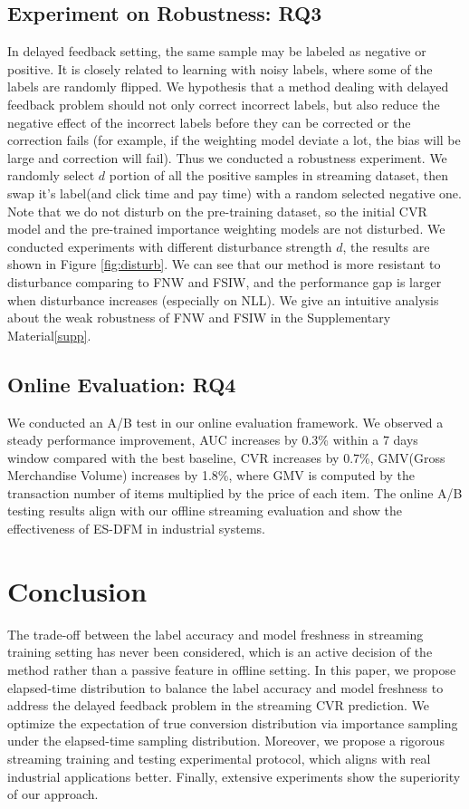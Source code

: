 \documentclass[letterpaper]{article} %
\newcommand{\mfigref}[1]{Figure \ref{#1}}
\begin{document}
\subsection{Experiment on Robustness: RQ3}

In delayed feedback setting, the same sample may be labeled as negative or positive. It is closely related to learning with noisy labels\cite{noisylabel}, where some of the labels are randomly flipped. We hypothesis that a method dealing with delayed feedback problem should not only correct incorrect labels, but also reduce the negative effect of the incorrect labels before they can be corrected or the correction fails (for example, if the weighting model deviate a lot, the bias will be large and correction will fail). Thus we conducted a robustness experiment. We randomly select $d$ portion of all the positive samples in streaming dataset, then swap it's label(and click time and pay time) with a random selected negative one. Note that we do not disturb on the pre-training dataset, so the initial CVR model and the pre-trained importance weighting models are not disturbed. We conducted experiments with different disturbance strength $d$, the results are shown in \mfigref{fig:disturb}. We can see that our method is more resistant to disturbance comparing to FNW and FSIW, and the performance gap is larger when disturbance increases (especially on NLL). We give an intuitive analysis about the weak robustness of FNW and FSIW in the Supplementary Material\ref{supp}.

\subsection{Online Evaluation: RQ4}

We conducted an A/B test in our online evaluation framework. We observed a steady performance improvement, AUC increases by 0.3\% within a 7 days window compared with the best baseline, CVR increases by 0.7\%, GMV(Gross Merchandise Volume) increases by 1.8\%, where GMV is computed by the transaction number of items multiplied by the price of each item. The online A/B testing results align with our offline streaming evaluation and show the effectiveness of ES-DFM in industrial systems.

\section{Conclusion}

The trade-off between the label accuracy and model freshness in streaming training setting has never been considered, which is an active decision of the method rather than a passive feature in offline setting. In this paper, we propose elapsed-time distribution to balance the label accuracy and model freshness to address the delayed feedback problem in the streaming CVR prediction. We optimize the expectation of true conversion distribution via importance sampling under the elapsed-time sampling distribution. Moreover, we propose a rigorous streaming training and testing experimental protocol, which aligns with real industrial applications better. Finally, extensive experiments show the superiority of our approach.
\end{document}
